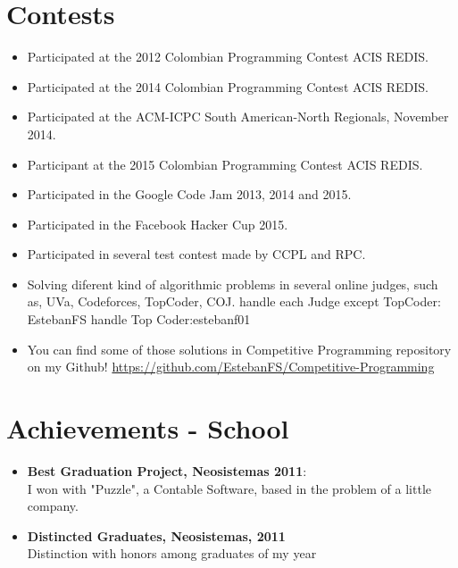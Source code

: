 \documentclass[a4paper,10pt]{article} %
\begin{document}
\section{Contests}
\begin{itemize}
 \item Participated at the 2012 Colombian Programming Contest ACIS REDIS.
 \item Participated at the 2014 Colombian Programming Contest ACIS REDIS.
 \item Participated at the ACM-ICPC South American-North Regionals, November 2014.
 \item Participant at the 2015 Colombian Programming Contest ACIS REDIS.
 \item Participated in the Google Code Jam 2013, 2014 and 2015.
 \item Participated in the Facebook Hacker Cup 2015.
 \item Participated in several test contest made by CCPL and RPC. 
 \item Solving diferent kind of algorithmic problems in several online judges, such as,
UVa, Codeforces, TopCoder, COJ.
handle each Judge except TopCoder: EstebanFS
handle Top Coder:estebanf01
\item You can find some of those solutions in Competitive Programming repository on my Github! \href{https://github.com/EstebanFS/Competitive-Programming}{https://github.com/EstebanFS/Competitive-Programming}
\end{itemize}


\section{Achievements - School}
\begin{itemize}
\item \textbf{Best Graduation Project, Neosistemas 2011}:\\
I won with "Puzzle", a Contable Software, based in the problem of a little company. 
\item \textbf{Distincted Graduates, Neosistemas, 2011}\\
Distinction with honors among graduates of my year
\end{itemize}
\end{document}
